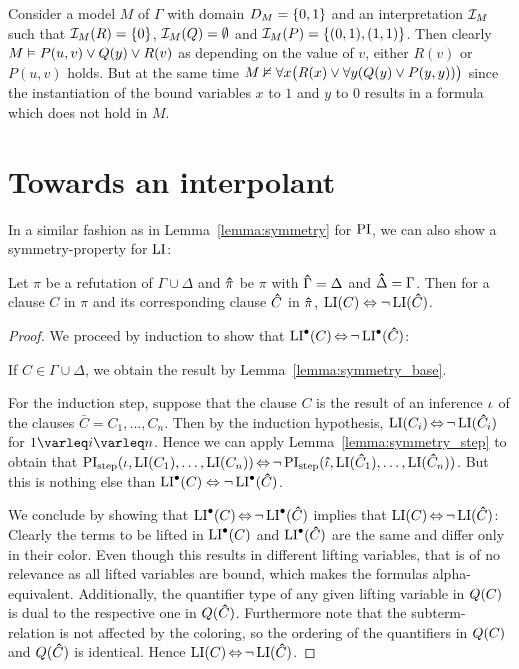 \begin{exa}
	Consider a model $M$ of $\Gamma$ with domain $D_{M} = \{0, 1\}$ and an interpretation $\mathcal{I}_{M}$ such that
	$\mathcal{I}_{M}(R) = \{0\}$,
	$\mathcal{I}_{M}(Q) = \emptyset$ and 
	$\mathcal{I}_{M}(P) = \{ (0, 1), (1, 1) \}$.
	Then clearly $M \vDash P(u, v) \lor Q(y) \lor R(v) $ as depending on the value of $v$, either $R(v)$ or $P(u, v)$ holds.
	But at the same time $M \nvDash \forall x \big( R(x) \lor  \forall y( Q(y) \lor P(y, y) ) \big)$ since the instantiation of the bound variables $x$ to $1$ and $y$ to $0$ results in a formula which does not hold in $M$.

\end{exa}


\section{Towards an interpolant}

In a similar fashion as in Lemma~\ref{lemma:symmetry} for $\operatorname{PI}$, we can also show a symmetry-property for $\operatorname{LI}$:

\begin{lemma}
	\label{lemma:li_symmetry}
	Let $\pi$ be a refutation of $\Gamma\cup\Delta$ and $\bm\hat \pi$ be $\pi$ with $\bm\hat \Gamma = \Delta$ and $\bm\hat \Delta = \Gamma$.
	Then for a clause $C$ in $\pi$ and its corresponding clause $\bm\hat C$ in $\bm\hat \pi$, $\operatorname{LI}(C) \;{\operatorname{\Leftrightarrow}}\; \lnot \operatorname{LI}(\bm\hat C)$.
\end{lemma}
\begin{proof}
	We proceed by induction to show that $\operatorname{LI}^\bullet(C) \operatorname{\Leftrightarrow} \lnot \operatorname{LI}^\bullet(\bm\hat C)$:

	If $C \in \Gamma\cup \Delta$, we obtain the result by Lemma~\ref{lemma:symmetry_base}.

	For the induction step, suppose that the clause $C$ is the result of an inference $\iota$ of the clauses $\bar C = C_1, \dots, C_n$.
	Then by the induction hypothesis, $\operatorname{LI}(C_i) \operatorname{\Leftrightarrow} \lnot \operatorname{LI}(\bm\hat{C}_i)$ for $1 \varleq i \varleq n$. 
	Hence we can apply Lemma~\ref{lemma:symmetry_step} to obtain that $\operatorname{PI}_{\mathrm{step}}(\iota, \operatorname{LI}(C_1), \dots, \operatorname{LI}(C_n)) \operatorname{\Leftrightarrow} \lnot \operatorname{PI}_{\mathrm{step}}(\bm\hat{\iota}, \operatorname{LI}(\bm\hat{C}_1), \dots, \operatorname{LI}(\bm\hat{C}_n))$.
	But this is nothing else than $\operatorname{LI}^\bullet(C) \;{\operatorname{\Leftrightarrow}}\; \lnot \operatorname{LI}^\bullet(\bm\hat{C})$.


	We conclude by showing that 
	$\operatorname{LI}^\bullet(C) \operatorname{\Leftrightarrow} \lnot \operatorname{LI}^\bullet(\bm\hat C)$ 
	implies that 
	$\operatorname{LI}(C) \operatorname{\Leftrightarrow} \lnot \operatorname{LI}(\bm\hat C)$:
	Clearly the terms to be lifted in $\operatorname{LI}^\bullet(C)$ and $\operatorname{LI}^\bullet(\bm\hat C)$ are the same and differ only in their color.
	Even though this results in different lifting variables, that is of no relevance as all lifted variables are bound, which makes the formulas alpha-equivalent.
	Additionally, the quantifier type of any given lifting variable in $Q(C)$ is dual to the respective one in $Q(\bm\hat C)$.
	Furthermore note that the subterm-relation is not affected by the coloring, so the ordering of the quantifiers in $Q(C)$ and $Q(\bm\hat C)$ is identical.
	Hence 
	$\operatorname{LI}(C) \operatorname{\Leftrightarrow} \lnot \operatorname{LI}(\bm\hat C)$.
\end{proof}


